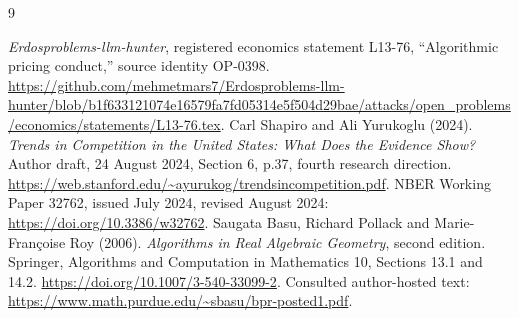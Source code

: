 \documentclass[11pt,a4paper]{article}
\begin{document}
\begin{thebibliography}{9}
\small\raggedright
{}
\emph{Erdosproblems-llm-hunter}, registered economics statement L13-76,
``Algorithmic pricing conduct,'' source identity OP-0398.
\url{https://github.com/mehmetmars7/Erdosproblems-llm-hunter/blob/b1f633121074e16579fa7fd05314e5f504d29bae/attacks/open_problems/economics/statements/L13-76.tex}.
Carl Shapiro and Ali Yurukoglu (2024).
\emph{Trends in Competition in the United States: What Does the Evidence Show?}
Author draft, 24 August 2024, Section 6, p.37, fourth research direction.
\url{https://web.stanford.edu/~ayurukog/trendsincompetition.pdf}.
NBER Working Paper 32762, issued July 2024, revised August 2024:
\url{https://doi.org/10.3386/w32762}.
Saugata Basu, Richard Pollack and Marie-Fran\c{c}oise Roy (2006).
\emph{Algorithms in Real Algebraic Geometry}, second edition.
Springer, Algorithms and Computation in Mathematics 10, Sections 13.1 and 14.2.
\url{https://doi.org/10.1007/3-540-33099-2}.
Consulted author-hosted text:
\url{https://www.math.purdue.edu/~sbasu/bpr-posted1.pdf}.
\end{thebibliography}
\end{document}
